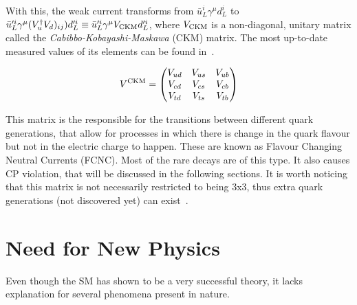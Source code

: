 With this, the weak current transforms from $\bar{u}^i_L \gamma^{\mu} d_L^i$ to $\bar{u}'^i_L \gamma^{\mu}(V_u^{\dag}V_d)_{ij}) d'^i_L \equiv \bar{u}'^i_L \gamma^{\mu} V_{\rm CKM} d'^i_L$, where $V_{\rm CKM}$ is a non-diagonal, unitary matrix called the \textit{Cabibbo-Kobayashi-Maskawa} (CKM) matrix. The most up-to-date measured values of its elements can be found in~\cite{PDG}. 

\begin{equation}
V^{\rm CKM} = \begin{pmatrix}
V_{ud} & V_{us} & V_{ub}\\ 
V_{cd} & V_{cs} & V_{cb}\\ 
V_{td} & V_{ts} & V_{tb}
\end{pmatrix}
\end{equation}

This matrix is the responsible for the transitions between different quark generations, that allow for processes in which there is change in the quark flavour but not in the electric charge to happen. These are known as Flavour Changing Neutral Currents (FCNC). Most of the rare decays are of this type. It also causes CP violation, that will be discussed in the following sections. It is worth noticing that this matrix is not necessarily restricted to being 3x3, thus extra quark generations (not discovered yet) can exist~\cite{CKM}.

 

\section{Need for New Physics}
Even though the SM has shown to be a very successful theory, it lacks explanation for several phenomena present in nature. 

